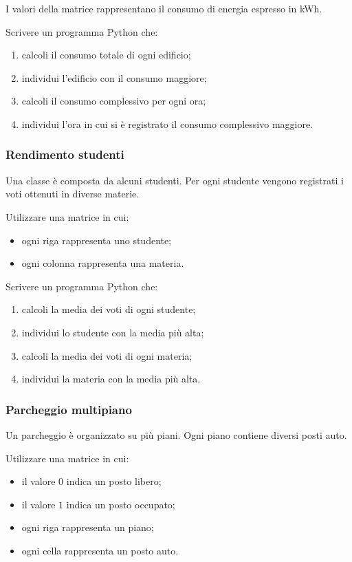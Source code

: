 \documentclass[a4paper,12pt]{article}
\begin{document}
	I valori della matrice rappresentano il consumo di energia espresso in kWh.
	
	Scrivere un programma Python che:
	
	\begin{enumerate}
		\item calcoli il consumo totale di ogni edificio;
		\item individui l'edificio con il consumo maggiore;
		\item calcoli il consumo complessivo per ogni ora;
		\item individui l'ora in cui si è registrato il consumo complessivo maggiore.
	\end{enumerate}
	
	\subsubsection{Rendimento studenti}
	Una classe è composta da alcuni studenti. Per ogni studente vengono registrati i voti ottenuti in diverse materie.
	
	Utilizzare una matrice in cui:
	\begin{itemize}
		\item ogni riga rappresenta uno studente;
		\item ogni colonna rappresenta una materia.
	\end{itemize}
	
	Scrivere un programma Python che:
	
	\begin{enumerate}
		\item calcoli la media dei voti di ogni studente;
		\item individui lo studente con la media più alta;
		\item calcoli la media dei voti di ogni materia;
		\item individui la materia con la media più alta.
	\end{enumerate}
	
	\subsubsection{Parcheggio multipiano}
	
	Un parcheggio è organizzato su più piani. Ogni piano contiene diversi posti auto.
	
	Utilizzare una matrice in cui:
	\begin{itemize}
		\item il valore $0$ indica un posto libero;
		\item il valore $1$ indica un posto occupato;
		\item ogni riga rappresenta un piano;
		\item ogni cella rappresenta un posto auto.
	\end{itemize}
	
\end{document}

